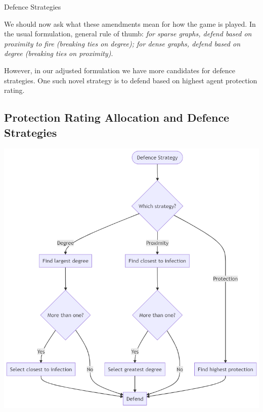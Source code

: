 \documentclass[unknownkeysallowed]{beamer}
\begin{document}
\begin{frame}{Defence Strategies}

We should now ask what these amendments mean for how the game is played. In the usual formulation, general rule of thumb: {\it for sparse graphs, defend based on proximity to fire (breaking ties on degree); for dense graphs, defend based on degree (breaking ties on proximity)}. \pause

\vspace{5pt}

However, in our adjusted formulation we have more candidates for defence strategies. One such novel strategy is to defend based on highest agent protection rating.

\end{frame}

\subsection{Protection Rating Allocation and Defence Strategies}

\begin{frame}
\centering\includegraphics[height=.9\textheight]{assets/flowcharts/defence}
\end{frame}
\end{document}
